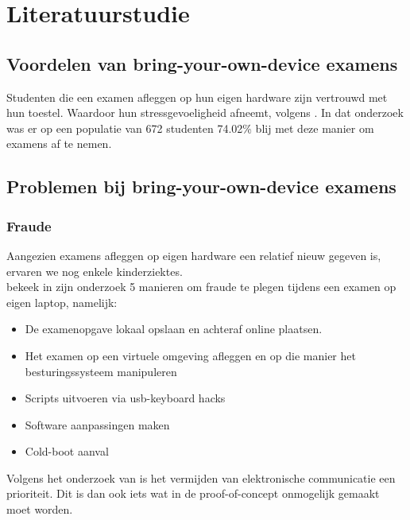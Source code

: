 
\section{Literatuurstudie}
\label{sec:literatuurstudie}

\subsection{Voordelen van bring-your-own-device examens}

Studenten die een examen afleggen op hun eigen hardware zijn vertrouwd met hun toestel. Waardoor hun stressgevoeligheid afneemt, volgens
 \textcite{TeckSwee2014}. In dat onderzoek was er op een populatie van 672 studenten 74.02\% blij met deze manier om examens af te nemen. 

\subsection{Problemen bij bring-your-own-device examens}
\subsubsection{Fraude}
Aangezien examens afleggen op eigen hardware een relatief nieuw gegeven is, ervaren we nog enkele kinderziektes.\\ \textcite{Dawson2016} bekeek in zijn onderzoek 5 manieren om fraude te plegen tijdens een examen op eigen laptop, namelijk: \\
\begin{itemize}
    \item De examenopgave lokaal opslaan en achteraf online plaatsen.
    \item Het examen op een virtuele omgeving afleggen en op die manier het besturingssysteem manipuleren
    \item Scripts uitvoeren via usb-keyboard hacks
    \item Software aanpassingen maken 
    \item Cold-boot aanval\\
\end{itemize}


Volgens het onderzoek van \textcite{VegendiaSindre2015} is het vermijden van elektronische communicatie een prioriteit. Dit is dan ook iets wat in de proof-of-concept onmogelijk gemaakt moet worden. 

